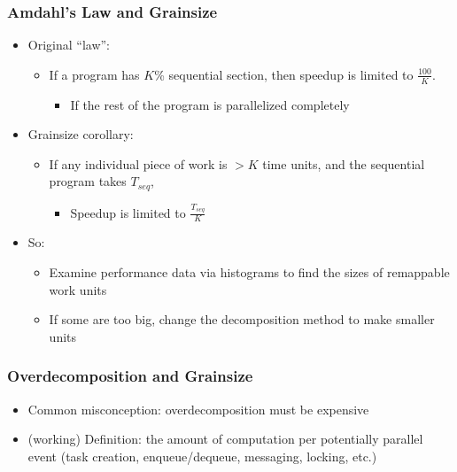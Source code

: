\begin{frame}
  \frametitle{Amdahl’s Law and Grainsize}
  \begin{itemize}
    \item Original ``law'':
      \begin{itemize}
      \item If a program has $K$\% sequential section, then speedup is limited
        to $\frac{100}{K}$.
        \begin{itemize}
        \item If the rest of the program is parallelized completely
        \end{itemize}
      \end{itemize}
    \item Grainsize corollary:
      \begin{itemize}
      \item If any individual piece of work is $> K$ time units, and the
        sequential program takes $T_{seq}$, 
        \begin{itemize}
        \item Speedup is limited to $\frac{T_{seq}}{K}$
        \end{itemize}
      \end{itemize}
    \item So:
      \begin{itemize}
      \item Examine performance data via histograms to find the sizes of
        remappable work units
      \item If some are too big, change the decomposition method to make
        smaller units
      \end{itemize}
  \end{itemize}
\end{frame}

\begin{frame}
  \frametitle{Overdecomposition and Grainsize}
  \begin{itemize}
    \item Common misconception: overdecomposition must be expensive
    \item (working) Definition: the amount of computation per potentially
      parallel event (task creation, enqueue/dequeue, messaging,
      locking, etc.)
  \end{itemize}
\end{frame}

